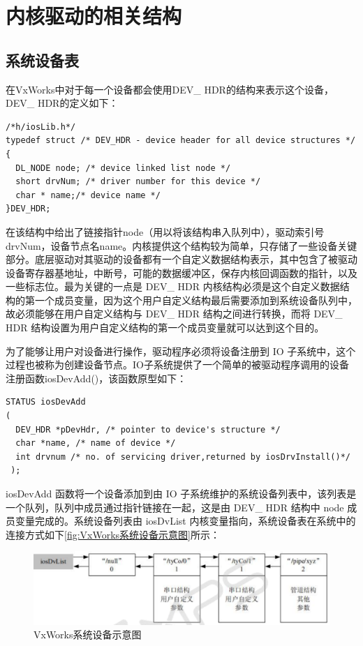 \section{内核驱动的相关结构}
\subsection{系统设备表}
	
	在VxWorks中对于每一个设备都会使用DEV\_ HDR的结构来表示这个设备，DEV\_ HDR的定义如下：
\lstset{language=C}
\begin{lstlisting}
/*h/iosLib.h*/
typedef struct /* DEV_HDR - device header for all device structures */ 
{ 
  DL_NODE node; /* device linked list node */ 
  short drvNum; /* driver number for this device */ 
  char * name;/* device name */ 
}DEV_HDR;  
\end{lstlisting}

	在该结构中给出了链接指针node（用以将该结构串入队列中），驱动索引号drvNum，设备节点名name。内核提供这个结构较为简单，只存储了一些设备关键部分。底层驱动对其驱动的设备都有一个自定义数据结构表示，其中包含了被驱动设备寄存器基地址，中断号，可能的数据缓冲区，保存内核回调函数的指针，以及一些标志位。最为关键的一点是 DEV\_ HDR 内核结构必须是这个自定义数据结构的第一个成员变量，因为这个用户自定义结构最后需要添加到系统设备队列中，故必须能够在用户自定义结构与 DEV\_ HDR 结构之间进行转换，而将 DEV\_ HDR 结构设置为用户自定义结构的第一个成员变量就可以达到这个目的。
	
	为了能够让用户对设备进行操作，驱动程序必须将设备注册到 IO 子系统中，这个过程也被称为创建设备节点。IO子系统提供了一个简单的被驱动程序调用的设备注册函数iosDevAdd()，该函数原型如下：
\lstset{language=C}
\begin{lstlisting}
STATUS iosDevAdd 
( 
  DEV_HDR *pDevHdr, /* pointer to device's structure */ 
  char *name, /* name of device */ 
  int drvnum /* no. of servicing driver,returned by iosDrvInstall()*/
 ); 
\end{lstlisting}

iosDevAdd 函数将一个设备添加到由 IO 子系统维护的系统设备列表中，该列表是一个队列，队列中成员通过指针链接在一起，这是由 DEV\_ HDR 结构中 node 成员变量完成的。系统设备列表由 iosDvList 内核变量指向，系统设备表在系统中的连接方式如下\autoref{fig:VxWorks系统设备示意图}所示：

\begin{figure}[!h]
\centering
\includegraphics[width=1.0\textwidth]{./graphics/vxworks-device-link.pdf}
\caption{VxWorks系统设备示意图}\label{fig:VxWorks系统设备示意图}
\end{figure}

